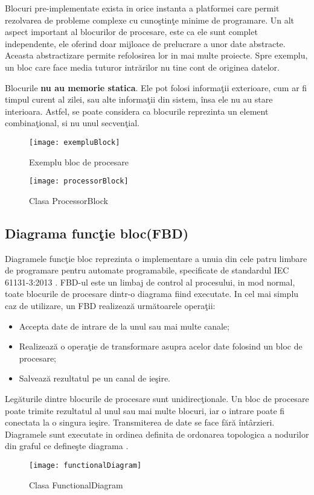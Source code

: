 Blocuri pre-implementate exista in orice instanta a platformei care permit rezolvarea de probleme complexe cu cunoştinţe minime de programare.
Un alt aspect important al blocurilor de procesare, este ca ele sunt complet independente, ele oferind doar mijloace de prelucrare a unor date abstracte. Aceasta abstractizare permite refolosirea lor in mai multe proiecte. Spre exemplu, un bloc care face media tuturor intrărilor nu tine cont de originea datelor. 

Blocurile \textbf{nu au memorie statica}. Ele pot folosi informaţii exterioare, cum ar fi timpul curent al zilei, sau alte informaţii din sistem, însa ele nu au stare interioara. Astfel, se poate considera ca blocurile reprezinta un element combinaţional, si nu unul secvenţial.
\begin{figure}[H]
	\centering
	\texttt{[image: exempluBlock]}
	\caption{Exemplu bloc de procesare}
\end{figure}

\begin{figure}[H]
	\centering
	\texttt{[image: processorBlock]}
	\caption{Clasa ProcessorBlock}
\end{figure}

\subsection{Diagrama funcţie bloc(FBD)}

Diagramele funcţie bloc reprezinta o implementare a unuia din cele patru limbare de programare pentru automate programabile, specificate de standardul IEC 61131-3:2013 \autocite[128-140]{IEC61131-3}. FBD-ul este un limbaj de control al procesului, in mod normal, toate blocurile de procesare dintr-o diagrama fiind executate.
In cel mai simplu caz de utilizare, un FBD realizează următoarele operaţii:
\begin{itemize}
	\item Accepta date de intrare de la unul sau mai multe canale;
	\item Realizează o operaţie de transformare asupra acelor date folosind un bloc de procesare;
	\item Salvează rezultatul pe un canal de ieşire.
\end{itemize}
Legăturile dintre blocurile de procesare sunt unidirecţionale. Un bloc de procesare poate trimite rezultatul al unul sau mai multe blocuri, iar o intrare poate fi conectata la o singura ieşire. Transmiterea de date se face fără întârzieri. Diagramele sunt executate in ordinea definita de ordonarea topologica a nodurilor din graful ce defineşte diagrama \autocite[20-50]{IEC61499}. 
\begin{figure}[H]
	\centering
	\texttt{[image: functionalDiagram]}
	\caption{Clasa FunctionalDiagram}
\end{figure}

